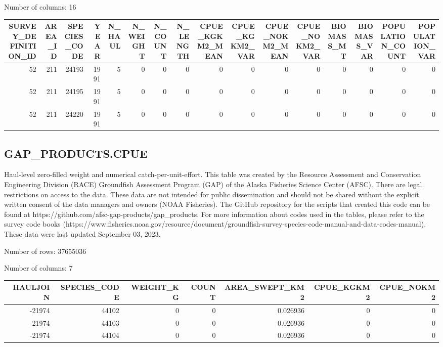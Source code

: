 \documentclass[
  letterpaper,
  oneside,
  open=any]{scrbook}
\begin{document}
Number of columns: 16

\begin{tabular}{r|r|r|r|r|r|r|r|r|r|r|r|r|r|r|r}
\hline
SURVEY\_DEFINITION\_ID & AREA\_ID & SPECIES\_CODE & YEAR & N\_HAUL & N\_WEIGHT & N\_COUNT & N\_LENGTH & CPUE\_KGKM2\_MEAN & CPUE\_KGKM2\_VAR & CPUE\_NOKM2\_MEAN & CPUE\_NOKM2\_VAR & BIOMASS\_MT & BIOMASS\_VAR & POPULATION\_COUNT & POPULATION\_VAR\\
\hline
52 & 211 & 24193 & 1991 & 5 & 0 & 0 & 0 & 0 & 0 & 0 & 0 & 0 & 0 & 0 & 0\\
\hline
52 & 211 & 24195 & 1991 & 5 & 0 & 0 & 0 & 0 & 0 & 0 & 0 & 0 & 0 & 0 & 0\\
\hline
52 & 211 & 24220 & 1991 & 5 & 0 & 0 & 0 & 0 & 0 & 0 & 0 & 0 & 0 & 0 & 0\\
\hline
\end{tabular}

\hypertarget{gap_products.cpue}{%
\subsection{GAP\_PRODUCTS.CPUE}\label{gap_products.cpue}}

Haul-level zero-filled weight and numerical catch-per-unit-effort. This
table was created by the Resource Assessment and Conservation
Engineering Division (RACE) Groundfish Assessment Program (GAP) of the
Alaska Fisheries Science Center (AFSC). There are legal restrictions on
access to the data. These data are not intended for public dissemination
and should not be shared without the explicit written consent of the
data managers and owners (NOAA Fisheries). The GitHub repository for the
scripts that created this code can be found at
https://github.com/afsc-gap-products/gap\_products. For more information
about codes used in the tables, please refer to the survey code books
(https://www.fisheries.noaa.gov/resource/document/groundfish-survey-species-code-manual-and-data-codes-manual).
These data were last updated September 03, 2023.

Number of rows: 37655036

Number of columns: 7

\begin{tabular}{r|r|r|r|r|r|r}
\hline
HAULJOIN & SPECIES\_CODE & WEIGHT\_KG & COUNT & AREA\_SWEPT\_KM2 & CPUE\_KGKM2 & CPUE\_NOKM2\\
\hline
-21974 & 44102 & 0 & 0 & 0.026936 & 0 & 0\\
\hline
-21974 & 44103 & 0 & 0 & 0.026936 & 0 & 0\\
\hline
-21974 & 44104 & 0 & 0 & 0.026936 & 0 & 0\\
\hline
\end{tabular}
\end{document}

